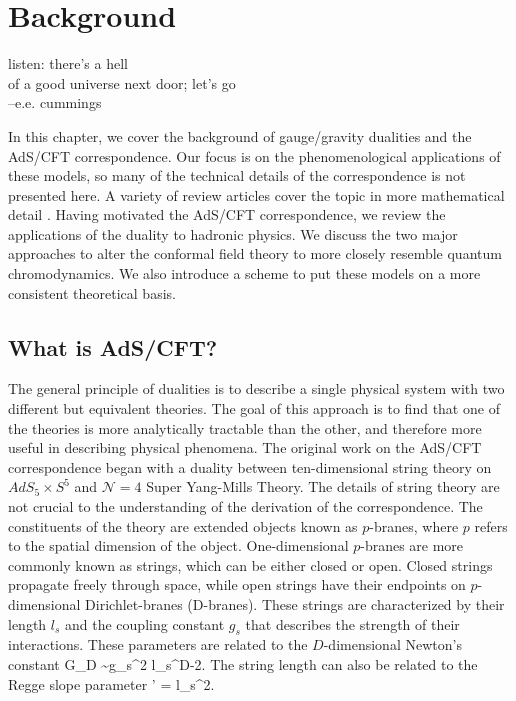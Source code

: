 \chapter{Background}
\label{background}

\begin{flushright}
 listen: there's a hell \\
of a good universe next door; let's go \\
--e.e. cummings
\end{flushright}

In this chapter, we cover the background of gauge/gravity dualities and the AdS/CFT correspondence.
Our focus is on the phenomenological applications of these models, so many of the technical details of the correspondence is not presented here.
A variety of review articles cover the topic in more mathematical detail \cite{Ramallo2013,Zaffaroni2000,Kim2012,Erdmenger:2007cm,Edelstein:2009iv,KLEBANOV2006,Gubser2009}.
Having motivated the AdS/CFT correspondence, we review the applications of the duality to hadronic physics. 
We discuss the two major approaches to alter the conformal field theory to more closely resemble quantum chromodynamics.
We also introduce a scheme to put these models on a more consistent theoretical basis.

\section{What is AdS/CFT?}
The general principle of dualities is to describe a single physical system with two different but equivalent theories. 
The goal of this approach is to find that one of the theories is more analytically tractable than the other, and therefore more useful in describing physical phenomena.
The original work on the AdS/CFT correspondence began with a duality between ten-dimensional string theory on $AdS_5 \times S^5$ and $\mathcal{N}=4 $ Super Yang-Mills Theory.
The details of string theory are not crucial to the understanding of the derivation of the correspondence.
The constituents of the theory are extended objects known as $p$-branes, where $p$ refers to the spatial dimension of the object. 
One-dimensional $p$-branes are more commonly known as strings, which can be either closed or open.
Closed strings propagate freely through space, while open strings have  their endpoints on $p$-dimensional Dirichlet-branes (D-branes). 
These strings are characterized by their length $l_s$ and the coupling constant $g_s$ that describes the strength of their interactions. 
These parameters are related to the $D$-dimensional Newton's constant
\be
G_D \sim g_s^2 l_s^{D-2}.
\ee
The string length can also be related to the Regge slope parameter
\be
\alpha' = l_s^2.
\label{eq:ReggeSlope}
\ee

